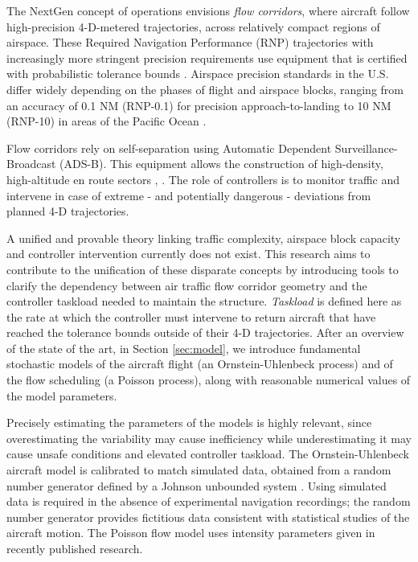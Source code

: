 \documentclass[conference]{IEEEtran}
\begin{document}
The NextGen concept of operations \cite{JPDO:conops07} envisions \emph{flow corridors}, where aircraft follow high-precision 4-D-metered trajectories, across relatively compact regions of airspace. These Required Navigation Performance (RNP) trajectories with increasingly more stringent precision requirements use equipment that is certified with probabilistic tolerance bounds \cite{PBN08}. Airspace precision standards in the U.S. differ widely depending on the phases of flight and airspace blocks, ranging from an accuracy of 0.1 NM (RNP-0.1) for precision approach-to-landing to 10 NM (RNP-10) in areas of the Pacific Ocean \cite{Radio08}.

Flow corridors rely on self-separation using Automatic Dependent Surveillance-Broadcast (ADS-B). This equipment allows the construction of high-density, high-altitude en route sectors \cite{Mun07}, \cite{You10}. The role of controllers is to monitor traffic and intervene in case of extreme - and potentially dangerous - deviations from planned 4-D trajectories. 

A unified and provable theory linking traffic complexity, airspace block capacity and controller intervention currently does not exist. This research aims to contribute to the unification of these disparate concepts by introducing tools to clarify the dependency between air traffic flow corridor geometry and the controller taskload needed to maintain the structure. \emph{Taskload} is defined here as the rate at which the controller must intervene to return aircraft that have reached the tolerance bounds outside of their 4-D trajectories. After an overview of the state of the art, in Section \ref{sec:model}, we introduce fundamental stochastic models of the aircraft flight (an Ornstein-Uhlenbeck process) and of the flow scheduling (a Poisson process), along with reasonable numerical values of the model parameters.

Precisely estimating the parameters of the models is highly relevant, since overestimating the variability may cause inefficiency while underestimating it may cause unsafe conditions and elevated controller taskload. The Ornstein-Uhlenbeck aircraft model is calibrated to match simulated data, obtained from a random number generator defined by a Johnson unbounded system . Using simulated data is required in the absence of experimental navigation recordings; the random number generator provides fictitious data consistent with statistical studies of the aircraft motion. The Poisson flow model uses intensity parameters given in recently published research. 
\end{document}
